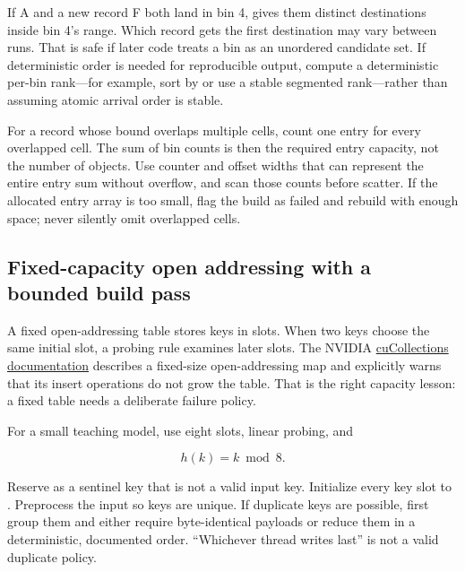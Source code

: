 If A and a new record F both land in bin 4,  gives them distinct destinations inside bin 4's range. Which record gets the first destination may vary between runs. That is safe if later code treats a bin as an unordered candidate set. If deterministic order is needed for reproducible output, compute a deterministic per-bin rank---for example, sort by  or use a stable segmented rank---rather than assuming atomic arrival order is stable.

For a record whose bound overlaps multiple cells, count one entry for every overlapped cell. The sum of bin counts is then the required entry capacity, not the number of objects. Use counter and offset widths that can represent the entire entry sum without overflow, and scan those counts before scatter. If the allocated entry array is too small, flag the build as failed and rebuild with enough space; never silently omit overlapped cells.

\subsection{Fixed-capacity open addressing with a bounded build pass}\label{03-visual-computing-i-ch016-fixed-capacity-open-addressing-with-a-bounded-build-pass}

\hypertarget{03-visual-computing-i-ch016-fixed-capacity-open-addressing-with-a-bounded-build-pass}{}

A fixed open-addressing table stores keys in slots. When two keys choose the same initial slot, a probing rule examines later slots. The NVIDIA \href{https://github.com/NVIDIA/cuCollections/blob/dev/include/cuco/static_map.cuh}{cuCollections  documentation} describes a fixed-size open-addressing map and explicitly warns that its insert operations do not grow the table. That is the right capacity lesson: a fixed table needs a deliberate failure policy.

For a small teaching model, use eight slots, linear probing, and

\[
h(k)=k\bmod8.
\]

Reserve  as a sentinel key that is not a valid input key. Initialize every key slot to . Preprocess the input so keys are unique. If duplicate keys are possible, first group them and either require byte-identical payloads or reduce them in a deterministic, documented order. ``Whichever thread writes last'' is not a valid duplicate policy.

